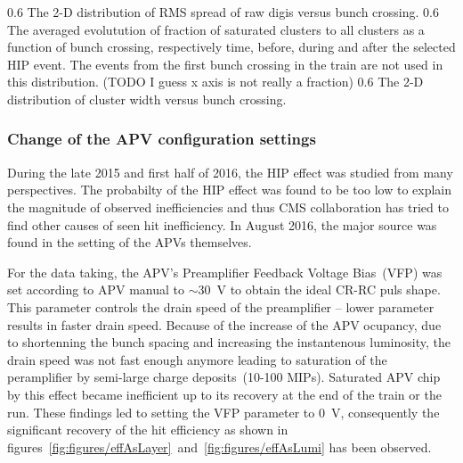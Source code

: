                  {0.6}       %
                 {The 2-D distribution of RMS spread of raw digis versus bunch crossing. } %
                 {0.6}       %
                 {The averaged evolutution of fraction of saturated clusters to all clusters as a function of bunch crossing, respectively time, before, during and after the selected HIP event.  The events from the first bunch crossing in the train are not used in this distribution. (TODO I guess x axis is not really a fraction) } %
                 {0.6}       %
                 {The 2-D distribution of cluster width versus bunch crossing. } %


\subsubsection{Change of the APV configuration settings}

During the late 2015 and first half of 2016, the HIP effect was studied from many perspectives. The probabilty of the HIP effect was found to be too low to explain the magnitude of observed inefficiencies and thus CMS collaboration has tried to find other causes of seen hit inefficiency. In August 2016, the major source was found in the setting of the APVs themselves.

For the data taking, the APV's Preamplifier Feedback Voltage Bias~(VFP) was set according to APV manual to $\sim$30~V to obtain the ideal CR-RC puls shape. This parameter controls the drain speed of the preamplifier -- lower parameter results in faster drain speed. Because of the increase of the APV ocupancy, due to shortenning the bunch spacing and increasing the instantenous luminosity, the drain speed was not fast enough anymore leading to saturation of the peramplifier by semi-large charge deposits~(10-100 MIPs). Saturated APV chip by this effect became inefficient up to its recovery at the end of the train or the run. These findings led to setting the VFP parameter to 0~V, consequently the significant recovery of the hit efficiency as shown in figures~\ref{fig:figures/effAsLayer}~and~\ref{fig:figures/effAsLumi} has been observed.


